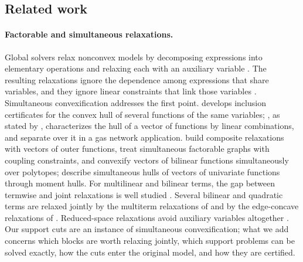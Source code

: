\subsection{Related work}\label{sec:related}

\paragraph{Factorable and simultaneous relaxations.}
Global solvers relax nonconvex models by decomposing expressions into
elementary operations and relaxing each with an auxiliary variable
\citep{McCormick1976,SmithPantelides1999,TawarmalaniSahinidis2004,BelottiEtAl2009,BestuzhevaEtAl2025}.
The resulting relaxations ignore the dependence among expressions that share
variables, and they ignore linear constraints that link those variables
\citep{ZhuHeTawarmalani2026}. Simultaneous convexification addresses the
first point. \citet{Tawarmalani2010} develops inclusion certificates for the
convex hull of several functions of the same variables;
\citet{Ballerstein2013}, as stated by \citet[Proposition~1]{LiersEtAl2021},
characterizes the hull of a vector of functions by linear combinations, and
\citet{LiersEtAl2021} separate over it in a gas network application.
\citet{HeTawarmalani2021,HeTawarmalani2022,HeTawarmalani2024} build composite
relaxations with vectors of outer functions, \citet{ZhuHeTawarmalani2026}
treat simultaneous factorable graphs with coupling constraints, and
\citet{DavarniaRichardTawarmalani2017} convexify vectors of bilinear
functions simultaneously over polytopes; \citet{HeLiuTawarmalani2025}
describe simultaneous hulls of vectors of univariate functions through moment
hulls. For multilinear and bilinear terms,
the gap between termwise and joint relaxations is well studied
\citep{Rikun1997,LuedtkeNamazifarLinderoth2012,BolandEtAl2017,BaoKhajaviradSahinidisTawarmalani2015}.
Several bilinear and quadratic terms are relaxed jointly by the multiterm
relaxations of \citet{BaoSahinidisTawarmalani2009} and by the edge-concave
relaxations of \citet{MisenerFloudas2012}. Reduced-space relaxations avoid
auxiliary variables altogether
\citep{TsoukalasMitsos2014,BongartzMitsos2017,NajmanBongartzMitsos2021}. Our
support cuts are an instance of simultaneous convexification; what we add
concerns which blocks are worth relaxing jointly, which support problems can
be solved exactly, how the cuts enter the original model, and how they are
certified.

